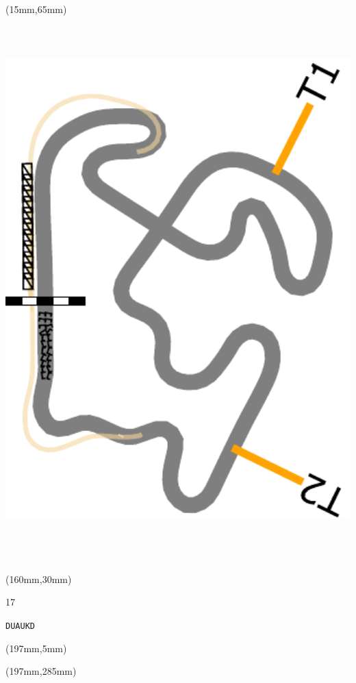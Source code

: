 \begin{textblock*}{185mm}(15mm,65mm)%
\centering
\mbox{\includegraphics[width=185mm,height=210mm,keepaspectratio]{PT/DUAUKD.pdf}}
\end{textblock*}
\begin{textblock*}{40mm}(160mm,30mm)%
\Large
\par{} 
\par17 
\par\hfill\tiny\tt DUAUKD\\
\end{textblock*}
\begin{textblock*}{20mm}(197mm,5mm)%
\fbox{\thepage}
\label{DUAUKD}
\end{textblock*}
\begin{textblock*}{20mm}(197mm,285mm)%
\fbox{\thepage}
\end{textblock*}

